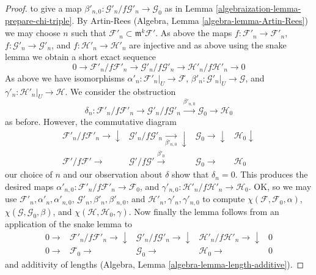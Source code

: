 \begin{proof}
to give a map
$\beta'_{n, 0} : \mathcal{G}'_n/f\mathcal{G}'_n \to \mathcal{G}_0$
as in Lemma \ref{algebraization-lemma-prepare-chi-triple}.
By Artin-Rees (Algebra, Lemma \ref{algebra-lemma-Artin-Rees})
we may choose $n$ such that
$\mathcal{F}'_n \subset \mathfrak m^k \mathcal{F}'$.
As above the maps
$f : \mathcal{F}'_n \to \mathcal{F}'_n$,
$f : \mathcal{G}'_n \to \mathcal{G}'_n$, and
$f : \mathcal{H}'_n \to \mathcal{H}'_n$ are injective
and as above using the snake lemma we obtain a short exact
sequence
$$
0 \to \mathcal{F}'_n/f\mathcal{F}'_n \to
\mathcal{G}'_n/f\mathcal{G}'_n \to
\mathcal{H}'_n/f\mathcal{H}'_n \to 0
$$
As above we have isomorphisms
$\alpha'_n : \mathcal{F}'_n|_U \to \mathcal{F}$,
$\beta'_n : \mathcal{G}'_n|_U \to \mathcal{G}$, and
$\gamma'_n : \mathcal{H}'_n|_U \to \mathcal{H}$.
We consider the obstruction
$$
\delta_n :
\mathcal{F}'_n/f\mathcal{F}'_n \to
\mathcal{G}'_n/f\mathcal{G}'_n
\xrightarrow{\beta'_{n, 0}}
\mathcal{G}_0 \to
\mathcal{H}_0
$$
as before. However, the commutative diagram
$$
\begin{array}{cccc}\mathcal{F}'_n/f\mathcal{F}'_n \longrightarrow\downarrow & \mathcal{G}'_n/f\mathcal{G}'_n \underset{\beta'_{n, 0}}{\longrightarrow}\downarrow & \mathcal{G}_0 \longrightarrow\downarrow & \mathcal{H}_0 \downarrow \\ \mathcal{F}'/f\mathcal{F}' \longrightarrow & \mathcal{G}'/f\mathcal{G}' \overset{\beta'_0}{\longrightarrow} & \mathcal{G}_0 \longrightarrow & \mathcal{H}_0\end{array}
$$
our choice of $n$ and our observation about $\delta$
show that $\delta_n = 0$.
This produces the desired maps
$\alpha'_{n, 0} : \mathcal{F}'_n/f\mathcal{F}'_n \to \mathcal{F}_0$, and
$\gamma'_{n, 0} : \mathcal{H}'_n/f\mathcal{H}'_n \to \mathcal{H}_0$.
OK, so we may use
$\mathcal{F}'_n, \alpha'_n, \alpha'_{n, 0}$,
$\mathcal{G}'_n, \beta'_n, \beta'_{n, 0}$, and
$\mathcal{H}'_n, \gamma'_n, \gamma'_{n, 0}$
to compute
$\chi(\mathcal{F}, \mathcal{F}_0, \alpha)$,
$\chi(\mathcal{G}, \mathcal{G}_0, \beta)$, and
$\chi(\mathcal{H}, \mathcal{H}_0, \gamma)$.
Now finally the lemma follows from
an application of the snake lemma to
$$
\begin{array}{ccccc}0 \longrightarrow & \mathcal{F}'_n/f\mathcal{F}'_n \longrightarrow\downarrow & \mathcal{G}'_n/f\mathcal{G}'_n \longrightarrow\downarrow & \mathcal{H}'_n/f\mathcal{H}'_n \longrightarrow\downarrow & 0 \\ 0 \longrightarrow & \mathcal{F}_0 \longrightarrow & \mathcal{G}_0 \longrightarrow & \mathcal{H}_0 \longrightarrow & 0\end{array}
$$
and additivity of lengths (Algebra, Lemma \ref{algebra-lemma-length-additive}).
\end{proof}


